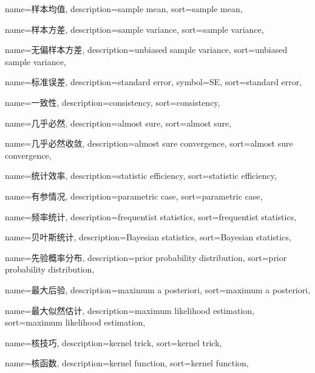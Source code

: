 {
  name=样本均值, %
  description={sample mean},
  sort={sample mean},
}

{
  name=样本方差, %
  description={sample variance},
  sort={sample variance},
}

{
  name=无偏样本方差, %
  description={unbiased sample variance},
  sort={unbiased sample variance},
}

{
  name=标准误差,
  description={standard error},
  symbol={SE},
  sort={standard error},
}

{
  name=一致性,
  description={consistency},
  sort={consistency},
}

{
  name=几乎必然,
  description={almost sure},
  sort={almost sure},
}

{
  name=几乎必然收敛,
  description={almost sure convergence},
  sort={almost sure convergence},
}

{
  name=统计效率,
  description={statistic efficiency},
  sort={statistic efficiency},
}

{
  name=有参情况,
  description={parametric case},
  sort={parametric case},
}

{
  name=频率统计,
  description={frequentist statistics},
  sort={frequentist statistics},
}

{
  name=贝叶斯统计,
  description={Bayesian statistics},
  sort={Bayesian statistics},
}

{
  name=先验概率分布,
  description={prior probability distribution},
  sort={prior probability distribution},
}

{
  name=最大后验,
  description={maximum a posteriori},
  sort={maximum a posteriori},
}

{
  name=最大似然估计,
  description={maximum likelihood estimation},
  sort={maximum likelihood estimation},
}

{
  name=核技巧,
  description={kernel trick},
  sort={kernel trick},
}

{
  name=核函数,
  description={kernel function},
  sort={kernel function},
}

